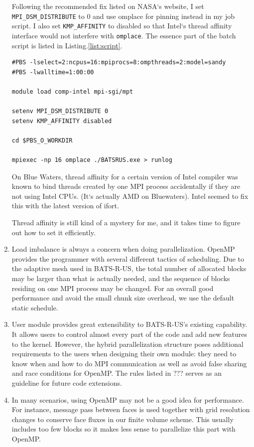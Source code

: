 \documentclass[fleqn,11pt]{SelfArx} %
\begin{document}
\begin{enumerate}
Following the recommended fix listed on NASA`s website, I set \verb|MPI_DSM_DISTRIBUTE| to 0 and use omplace for pinning instead in my job script. I also set \verb|KMP_AFFINITY| to disabled so that Intel`s thread affinity interface would not interfere with \verb|omplace|. The essence part of the batch script is listed in Listing.\ref{list:script}.

\begin{lstlisting}[caption=Sample batch script on Pleiades for hybrid runs,frame=tlrb,breaklines=true,columns=fullflexible,label={list:script}] 
#PBS -lselect=2:ncpus=16:mpiprocs=8:ompthreads=2:model=sandy
#PBS -lwalltime=1:00:00

module load comp-intel mpi-sgi/mpt

setenv MPI_DSM_DISTRIBUTE 0
setenv KMP_AFFINITY disabled

cd $PBS_O_WORKDIR

mpiexec -np 16 omplace ./BATSRUS.exe > runlog
\end{lstlisting}

On Blue Waters, thread affinity for a certain version of Intel compiler was known to bind threads created by one MPI process accidentally if they are not using Intel CPUs. (It`s actually AMD on Bluewaters). Intel seemed to fix this with the latest version of ifort.

Thread affinity is still kind of a mystery for me, and it takes time to figure out how to set it efficiently.

\item Load imbalance is always a concern when doing parallelization. OpenMP provides the programmer with several different tactics of scheduling. Due to the adaptive mesh used in BATS-R-US, the total number of allocated blocks may be larger than what is actually needed, and the sequence of blocks residing on one MPI process may be changed. For an overall good performance and avoid the small chunk size overhead, we use the default static schedule. 
\item User module provides great extensibility to BATS-R-US's existing capability. It allows users to control almost every part of the code and add new features to the kernel. However, the hybrid parallelization structure poses additional requirements to the users when designing their own module: they need to know when and how to do MPI communication as well as avoid false sharing and race conditions for OpenMP. The rules listed in ??? serves as an guideline for future code extensions.
\item In many scenarios, using OpenMP may not be a good idea for performance. For instance, message pass between faces is used together with grid resolution changes to conserve face fluxes in our finite volume scheme.  This usually includes too few blocks so it makes less sense to parallelize this part with OpenMP.
\end{enumerate}
\end{document}
